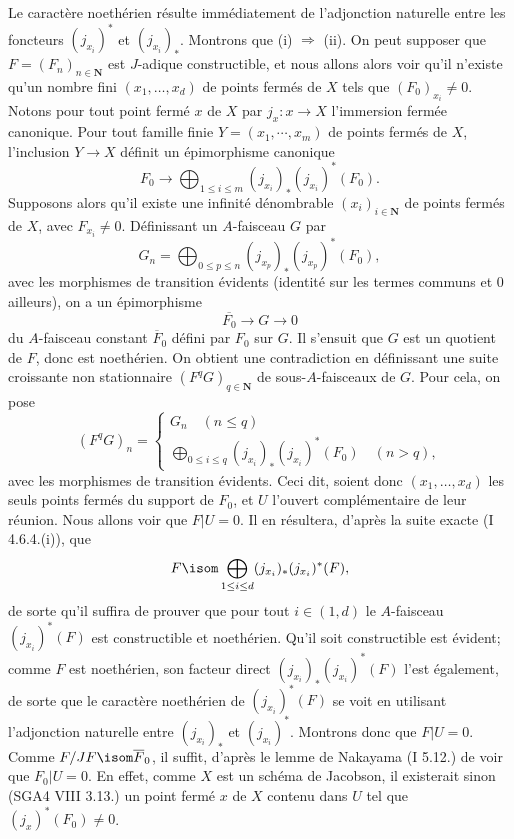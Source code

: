 Le caractère noethérien résulte immédiatement de l'adjonction naturelle entre les foncteurs $(j_{x_i})^*$ et $(j_{x_i})_*$. Montrons que (i) $\Rightarrow$ (ii). On peut supposer que $F = (F_n)_{n \in \mathbf{N}}$ est $J$-adique constructible, et nous allons alors voir qu'il n'existe qu'un nombre fini $(x_1, \dots, x_d)$ de points fermés de $X$ tels que $(F_0)_{x_i} \neq 0$. Notons pour tout point fermé $x$ de $X$ par $j_x: x \to X$ l'immersion fermée canonique. Pour tout famille finie $Y = (x_1, \cdots, x_m)$ de points fermés de $X$, l'inclusion $Y \to X$ définit un épimorphisme canonique
$$
F_0 \to \bigoplus_{1 \leq i \leq m} (j_{x_i})_* (j_{x_i})^*(F_0).
$$
Supposons alors qu'il existe une infinité dénombrable $(x_i)_{i \in \mathbf{N}}$ de points fermés de $X$, avec $F_{x_i} \neq 0$. Définissant un $A$-faisceau $G$ par
$$
G_n = \bigoplus_{0 \leq p \leq n} (j_{x_p})_*(j_{x_p})^*(F_0),
$$
avec les morphismes de transition évidents (identité sur les termes communs et $0$ ailleurs), on a un épimorphisme
$$
\overline{F_0} \to G \to 0
$$
du $A$-faisceau constant $\overline{F}_0$ défini par $F_0$ sur $G$. Il s'ensuit que $G$ est un quotient de $F$, donc est noethérien. On obtient une contradiction en définissant une suite croissante non stationnaire $(F^q G)_{q \in \mathbf{N}}$ de sous-$A$-faisceaux de $G$. Pour cela, on pose
$$
(F^q G)_n = 
\begin{cases}
    G_n \quad (n \leq q) \\
    \bigoplus_{0 \leq i \leq q} (j_{x_i})_*(j_{x_i})^*(F_0) \quad (n > q),
\end{cases}
$$
avec les morphismes de transition évidents. Ceci dit, soient donc $(x_1, \dots, x_d)$ les seuls points fermés du support de $F_0$, et $U$ l'ouvert complémentaire de leur réunion. Nous allons voir que $F|U = 0$. Il en résultera, d'après la suite exacte (I 4.6.4.(i)), que 
$$
F \isom \bigoplus_{1 \leq i \leq d} (j_{x_i})_*(j_{x_i})^*(F),
$$
de sorte qu'il suffira de prouver que pour tout $i \in (1, d)$ le $A$-faisceau $(j_{x_i})^*(F)$ est constructible et noethérien. Qu'il soit constructible est évident; comme $F$ est noethérien, son facteur direct $(j_{x_i})_*(j_{x_i})^*(F)$ l'est également, de sorte que le caractère noethérien de $(j_{x_i})^*(F)$ se voit en utilisant l'adjonction naturelle entre $(j_{x_i})_*$ et $(j_{x_i})^*$. Montrons donc que $F | U = 0$. Comme $F/JF \isom \overline{F}_ 0$, il suffit, d'après le lemme de Nakayama (I 5.12.) de voir que $F_0 | U = 0$. En effet, comme $X$ est un schéma de Jacobson, il existerait sinon (SGA4 VIII 3.13.) un point fermé $x$ de $X$ contenu dans $U$ tel que $(j_x)^*(F_0) \neq 0$.

